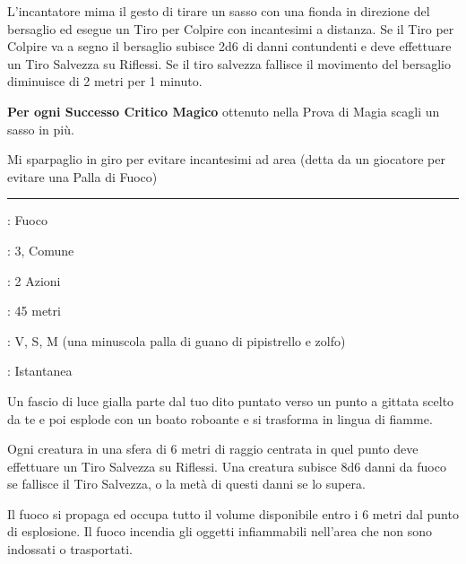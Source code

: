 \begin{multicols}{2}
L'incantatore mima il gesto di tirare un sasso con una fionda in direzione del bersaglio ed esegue un Tiro per Colpire con incantesimi a distanza.
Se il Tiro per Colpire va a segno il bersaglio subisce 2d6 di danni contundenti e deve effettuare un Tiro Salvezza su Riflessi. Se il tiro salvezza fallisce il movimento del bersaglio diminuisce di 2 metri per 1 minuto.

\textbf{Per ogni Successo Critico Magico} ottenuto nella Prova di Magia scagli un sasso in più.


\begin{changemargin}{0.3cm}{0.3cm}\begin{enfasi}{
			Mi sparpaglio in giro per evitare incantesimi ad area (detta da un giocatore per evitare una Palla di Fuoco)
}\end{enfasi}\end{changemargin}

\smallskip\noindent\rule{\linewidth}{2pt} \hypertarget{Palla di Fuoco}{}\medskip{}
\noindent
\begin{description}[noitemsep, topsep=0pt, parsep=0pt, partopsep=0pt, leftmargin=0cm, labelwidth=2.8cm]
	\item[\textbf{Lista di Magia}]: Fuoco
	\item[\textbf{Livello}]: 3, Comune
	\item[\textbf{T. di Lancio}]: 2 Azioni
	\item[\textbf{Gittata}]: 45 metri
	\item[\textbf{Componenti}]: V, S, M (una minuscola palla di guano di pipistrello e zolfo)
	\item[\textbf{Durata}]: Istantanea
\end{description}

Un fascio di luce gialla parte dal tuo dito puntato verso un punto a gittata scelto da te e poi esplode con un boato roboante e si trasforma in lingua di fiamme.

Ogni creatura in una sfera di 6 metri di raggio centrata in quel punto deve effettuare un Tiro Salvezza su Riflessi. Una creatura subisce 8d6 danni da fuoco se fallisce il Tiro Salvezza, o la metà di questi danni se lo supera.

Il fuoco si propaga ed occupa tutto il volume disponibile entro i 6 metri dal punto di esplosione. Il fuoco incendia gli oggetti infiammabili nell'area che non sono indossati o trasportati.


\end{multicols}
